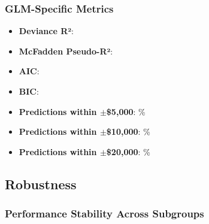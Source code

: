 \subsubsection{GLM-Specific Metrics}
\begin{itemize}
    \item \textbf{Deviance R²}: \ModelTwoDevianceRSquared{}
    \item \textbf{McFadden Pseudo-R²}: \ModelTwoMcFaddenRSquared{}
    \item \textbf{AIC}: \ModelTwoAIC{}
    \item \textbf{BIC}: \ModelTwoBIC{}
    \item \textbf{Predictions within $\pm$\$5,000}: \ModelTwoWithinFiveK{}\%
    \item \textbf{Predictions within $\pm$\$10,000}: \ModelTwoWithinTenK{}\%
    \item \textbf{Predictions within $\pm$\$20,000}: \ModelTwoWithinTwentyK{}\%
\end{itemize}

\subsection{Robustness}

\subsubsection{Performance Stability Across Subgroups}

